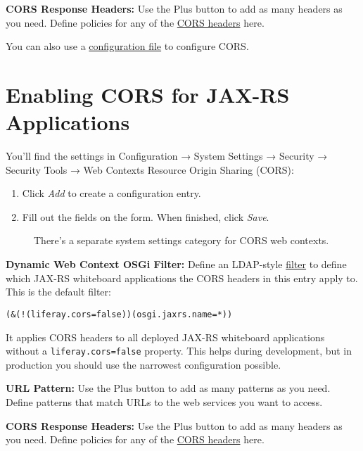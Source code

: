 \textbf{CORS Response Headers:} Use the Plus button to add as many
headers as you need. Define policies for any of the
\href{https://developer.mozilla.org/en-US/docs/Web/HTTP/Headers\#CORS}{CORS
headers} here.

You can also use a
\href{/docs/7-2/user/-/knowledge_base/u/understanding-system-configuration-files}{configuration
file} to configure CORS.

\section{Enabling CORS for JAX-RS
Applications}\label{enabling-cors-for-jax-rs-applications}

You'll find the settings in Configuration → System Settings → Security →
Security Tools → Web Contexts Resource Origin Sharing (CORS):

\begin{enumerate}
\def\labelenumi{\arabic{enumi}.}
\item
  Click \emph{Add} to create a configuration entry.
\item
  Fill out the fields on the form. When finished, click \emph{Save}.
\end{enumerate}

\begin{figure}
\centering
{}
\caption{There's a separate system settings category for CORS web
contexts.}
\end{figure}

\textbf{Dynamic Web Context OSGi Filter:} Define an LDAP-style
\href{https://osgi.org/specification/osgi.cmpn/7.0.0/service.http.whiteboard.html}{filter}
to define which JAX-RS whiteboard applications the CORS headers in this
entry apply to. This is the default filter:

\begin{verbatim}
(&(!(liferay.cors=false))(osgi.jaxrs.name=*))
\end{verbatim}

It applies CORS headers to all deployed JAX-RS whiteboard applications
without a \texttt{liferay.cors=false} property. This helps during
development, but in production you should use the narrowest
configuration possible.

\textbf{URL Pattern:} Use the Plus button to add as many patterns as you
need. Define patterns that match URLs to the web services you want to
access.

\textbf{CORS Response Headers:} Use the Plus button to add as many
headers as you need. Define policies for any of the
\href{https://developer.mozilla.org/en-US/docs/Web/HTTP/Headers\#CORS}{CORS
headers} here.

